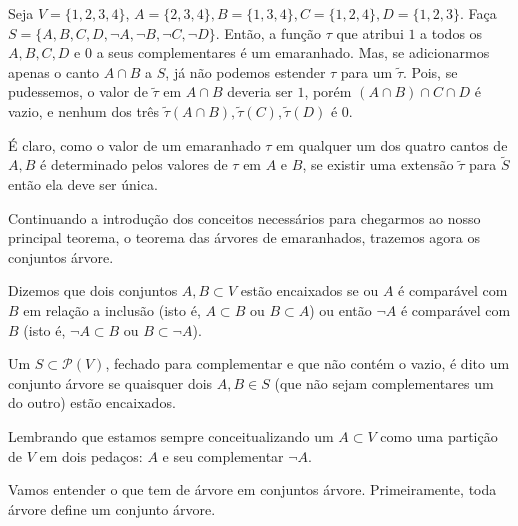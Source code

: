 \documentclass[11pt]{article}
\theoremstyle{definition}
\theoremstyle{definition}
\theoremstyle{definition}
\theoremstyle{definition}
\theoremstyle{definition}
\theoremstyle{definition}
\theoremstyle{definition}
\theoremstyle{definition}
\newtheorem*{definition*}{Definição}
\newenvironment{definicao*}{
\definecolor{shadecolor}{HTML}{defcfc}
\begin{shaded}
\begin{definition*}
}
{
\end{definition*}
\end{shaded}
}
\theoremstyle{definition}
\theoremstyle{definition}
\newtheorem*{example*}{Exemplo}
\newenvironment{exemplo*}{
\definecolor{shadecolor}{HTML}{b9e6d3}
\begin{shaded}
\begin{example*}
}
{
\end{example*}
\end{shaded}
}
\theoremstyle{definition}
\theoremstyle{definition}
\theoremstyle{definition}
\begin{document}
\begin{exemplo*}
  Seja $V = \{1,2,3,4\}$, $A = \{2,3,4\}, B = \{1,3,4\}, C = \{1,2,4\}, D = \{1,2,3\}$. Faça $S = \{A,B,C,D,\lnot A, \lnot B, \lnot C, \lnot D\}$. Então, a função $\tau$ que atribui $1$ a todos os $A,B,C,D$ e $0$ a seus complementares é um emaranhado. Mas, se adicionarmos apenas o canto $A \cap B$ a $S$, já não podemos estender $\tau$ para um $\tilde{\tau}$. Pois, se pudessemos, o valor de $\tilde{\tau}$ em $A \cap B$ deveria ser $1$, porém $(A \cap B) \cap C \cap D$ é vazio, e nenhum dos três $\tilde{\tau}(A \cap B), \tilde{\tau}(C), \tilde{\tau}(D)$ é $0$.
\end{exemplo*}

É claro, como o valor de um emaranhado $\tau$ em qualquer um dos quatro cantos de $A,B$ é determinado pelos valores de $\tau$ em $A$ e $B$, se existir uma extensão $\tilde{\tau}$ para $\tilde{S}$ então ela deve ser única.

Continuando a introdução dos conceitos necessários para chegarmos ao nosso principal teorema, o teorema das árvores de emaranhados, trazemos agora os conjuntos árvore.

\begin{definicao*}
  Dizemos que dois conjuntos $A,B \subset V$ estão encaixados se ou $A$ é comparável com $B$ em relação a inclusão (isto é, $A \subset B$ ou $B \subset A$) ou então $\lnot A$ é comparável com $B$ (isto é, $\lnot A \subset B$ ou $B \subset \lnot A$).

  Um $S \subset \mathcal{P}(V)$, fechado para complementar e que não contém o vazio, é dito um conjunto árvore se quaisquer dois $A,B \in S$ (que não sejam complementares um do outro) estão encaixados.
\end{definicao*}

Lembrando que estamos sempre conceitualizando um $A \subset V$ como uma partição de $V$ em dois pedaços: $A$ e seu complementar $\lnot A$.

Vamos entender o que tem de árvore em conjuntos árvore.  Primeiramente, toda árvore define um conjunto árvore.
\end{document}
